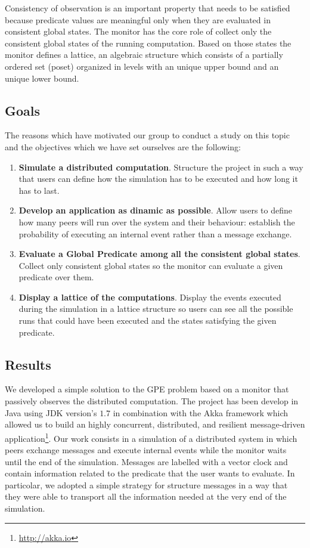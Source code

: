 \documentclass[11pt]{article}
\begin{document}
Consistency of observation is an important property that needs to be satisfied because predicate values are meaningful only when they are evaluated in consistent global states. The monitor has the core role of collect only the consistent global states of the running computation. Based on those states the monitor defines a lattice, an algebraic structure which consists of a partially ordered set (poset) organized in levels with an unique upper bound and an unique lower bound.

\subsection{Goals}

The reasons which have motivated our group to conduct a study on this topic and the objectives which we have set ourselves are the following:
\begin{enumerate}
\item \textbf{Simulate a distributed computation}. Structure the project in such a way that users can define how the simulation has to be executed and how long it has to last.
\item \textbf{Develop an application as dinamic as possible}. Allow users to define how many peers will run over the system and their behaviour: establish the probability of executing an internal event rather than a message exchange.
\item \textbf{Evaluate a Global Predicate among all the consistent global states}. Collect only consistent global states so the monitor can evaluate a given predicate over them.
\item \textbf{Display a lattice of the computations}. Display the events executed during the simulation in a lattice structure so users can see all the possible runs that could have been executed and the states satisfying the given predicate.
\end{enumerate}

\subsection{Results}

We developed a simple solution to the GPE problem based on a monitor that passively observes the distributed computation. The project has been develop in Java using JDK version's $1.7$ in combination with the Akka framework which allowed us to build an highly concurrent, distributed, and resilient message-driven application\footnote{\url{http://akka.io}}. Our work consists in a simulation of a distributed system in which peers exchange messages and execute internal events while the monitor waits until the end of the simulation. Messages are labelled with a vector clock and contain information related to the predicate that the user wants to evaluate. In particolar, we adopted a simple strategy for structure messages in a way that they were able to transport all the information needed at the very end of the simulation.
\end{document}
